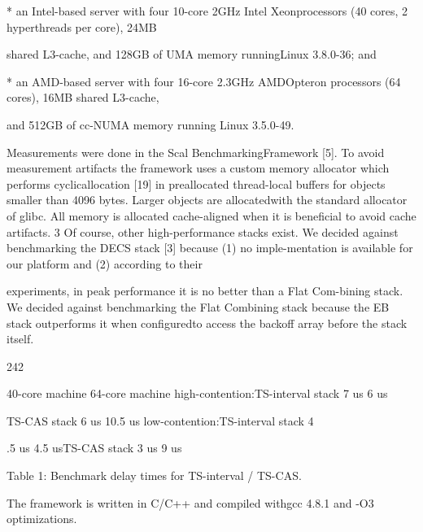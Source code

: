 * an Intel-based server with four 10-core 2GHz Intel Xeonprocessors (40 cores, 2 hyperthreads per core), 24MB

shared L3-cache, and 128GB of UMA memory runningLinux 3.8.0-36; and

* an AMD-based server with four 16-core 2.3GHz AMDOpteron processors (64 cores), 16MB shared L3-cache,

and 512GB of cc-NUMA memory running Linux 3.5.0-49.

Measurements were done in the Scal BenchmarkingFramework [5]. To avoid measurement artifacts the framework uses a custom memory allocator which performs cyclicallocation [19] in preallocated thread-local buffers for objects smaller than 4096 bytes. Larger objects are allocatedwith the standard allocator of glibc. All memory is allocated
cache-aligned when it is beneficial to avoid cache artifacts.
3 Of course, other high-performance stacks exist. We decided
against benchmarking the DECS stack [3] because (1) no imple-mentation is available for our platform and (2) according to their

experiments, in peak performance it is no better than a Flat Com-bining stack. We decided against benchmarking the Flat Combining stack because the EB stack outperforms it when configuredto access the backoff array before the stack itself.

242

40-core machine 64-core machine
high-contention:TS-interval stack 7 us 6 us

TS-CAS stack 6 us 10.5 us
low-contention:TS-interval stack 4

.5 us 4.5 usTS-CAS stack 3 us 9 us

Table 1: Benchmark delay times for TS-interval / TS-CAS.

The framework is written in C/C++ and compiled withgcc 4.8.1 and -O3 optimizations.

